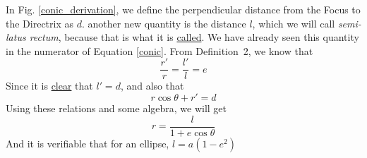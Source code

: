 \documentclass[12pt]{article}
\newcommand{\e}{\ensuremath{e}}
\begin{document}
\newline
	In Fig. \ref{conic_derivation}, we define the perpendicular distance from the Focus to the Directrix as $d$. another new quantity is the distance $l$, which we will call \emph{semi-latus rectum}, because that is what it is \href{http://staffhome.ecm.uwa.edu.au/~00043886/humour/invalid.proofs.html#15.5Proofbyparent}{called}. We have already seen this quantity in the numerator of Equation \ref{conic}. From Definition~2, we know that
	\begin{equation}
	\frac{r'}{r}=\frac{l'}{l}=\e
	\end{equation}
	Since it is \href{http://staffhome.ecm.uwa.edu.au/\~{}00043886/humour/invalid.proofs.html\#1.19Proofbypicture}{clear} that $l'=d$, and also that
	\begin{equation}
		r\cos\theta + r' = d
	\end{equation}
	Using these relations and some algebra, we will get
	\begin{equation}
		r = \frac{l}{1+e\cos\theta}
	\end{equation}
	And it is verifiable that for an ellipse, $l = a(1-e^2)$
\end{document}
